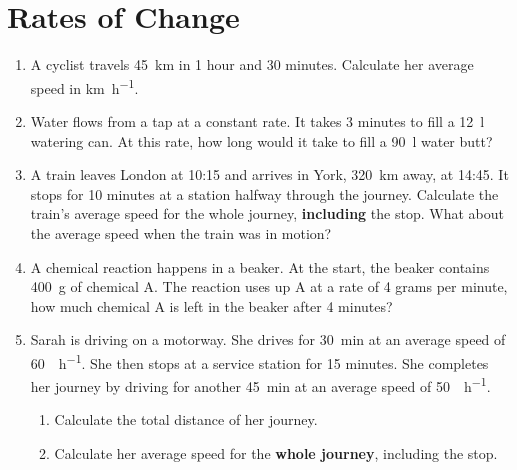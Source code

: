 \documentclass[12pt,a4paper]{article}
\begin{document}
\newpage{}

\section*{Rates of Change}

\begin{enumerate}
    \item A cyclist travels \SI{45}{\kilo\metre} in 1 hour and 30 minutes. Calculate her average speed in \si{\kilo\metre\per\hour}.

    \item Water flows from a tap at a constant rate. It takes 3 minutes to fill a \SI{12}{\litre} watering can. At this rate, how long would it take to fill a \SI{90}{\litre} water butt?

    \item A train leaves London at 10:15 and arrives in York, \SI{320}{\kilo\metre} away, at 14:45. It stops for 10 minutes at a station halfway through the journey. Calculate the train's average speed for the whole journey, \textbf{including} the stop. What about the average speed when the train was in motion?

    \item A chemical reaction happens in a beaker. At the start, the beaker contains \SI{400}{\gram} of chemical A. The reaction uses up A at a rate of 4 grams per minute, how much chemical A is left in the beaker after 4 minutes?

    \item Sarah is driving on a motorway. She drives for \SI{30}{\minute} at an average speed of \SI{60}{\per\hour}. She then stops at a service station for 15 minutes. She completes her journey by driving for another \SI{45}{\minute} at an average speed of \SI{50}{\per\hour}.
    \begin{enumerate}
        \item Calculate the total distance of her journey.
        \item Calculate her average speed for the \textbf{whole journey}, including the stop.
    \end{enumerate}

\end{enumerate}

\vspace{3cm}
\end{document}
